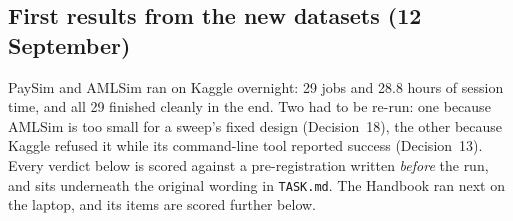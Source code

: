 \documentclass[11pt]{article}
\begin{document}
\subsection{First results from the new datasets (12 September)}
\label{sec:firstresults}

PaySim and AMLSim ran on Kaggle overnight: 29 jobs and 28.8 hours of session time, and all 29 finished
cleanly in the end. Two had to be re-run: one because AMLSim is too small for a sweep's fixed design
(Decision~18), the other because Kaggle refused it while its command-line tool reported success
(Decision~13). Every verdict
below is scored against a pre-registration written \emph{before} the run, and sits underneath the original
wording in \texttt{TASK.md}. The Handbook ran next on the laptop, and its items are scored further below.
\end{document}
